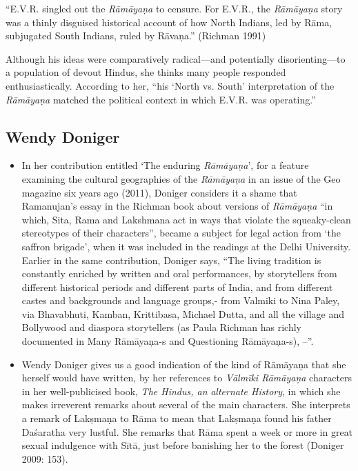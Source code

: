 \begin{myquote}
“E.V.R. singled out the \textit{Rāmāyaṇa} to censure. For E.V.R., the \textit{Rāmāyaṇa} story was a thinly disguised historical account of how North Indians, led by Rāma, subjugated South Indians, ruled by Rāvaṇa.” (Richman 1991)
\end{myquote}

Although his ideas were comparatively radical—and potentially disorienting—to a population of devout Hindus, she thinks many people responded enthusiastically. According to her, “his ‘North vs. South’ interpretation of the \textit{Rāmāyaṇa} matched the political context in which E.V.R. was operating.”


\subsection*{Wendy Doniger}

\begin{itemize}
\item In her contribution entitled ‘The enduring \textit{Rāmāyaṇa}’, for a feature examining the cultural geographies of the \textit{Rāmāyaṇa} in an issue of the Geo magazine six years ago (2011), Doniger considers it a shame that Ramanujan’s essay in the Richman book about versions of \textit{Rāmāyaṇa} “in which, Sita, Rama and Lakshmana act in ways that violate the squeaky-clean stereotypes of their characters”, became a subject for legal action from ‘the saffron brigade’, when it was included in the readings at the Delhi University. Earlier in the same contribution, Doniger says, “The living tradition is constantly enriched by written and oral performances, by storytellers from different historical periods and different parts of India, and from different castes and backgrounds and language groups,- from Valmiki to Nina Paley, via Bhavabhuti, Kamban, Krittibasa, Michael Dutta, and all the village and Bollywood and diaspora storytellers (as Paula Richman has richly documented in Many Rāmāyaņa-s and Questioning Rāmāyaņa-s), --”.

 \item Wendy Doniger gives us a good indication of the kind of Rāmāyaņa that she herself would have written, by her references to \textit{Vālmīki Rāmāyaņa} characters in her well-publicised book, \textit{The Hindus, an} \textit{alternate History}, in which she makes irreverent remarks about several of the main characters. She interprets a remark of Lakṣmaṇa to Rāma to mean that Lakṣmaṇa found his father Daśaratha very lustful. She remarks that Rāma spent a week or more in great sexual indulgence with Sītā, just before banishing her to the forest (Doniger 2009: 153).

\end{itemize}


